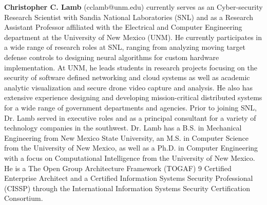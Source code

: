 \documentclass[12pt,letterpaper]{article}
\begin{document}
{\bf Christopher C. Lamb} (cclamb@unm.edu) currently serves as an Cyber-security Research Scientist with Sandia National Laboratories (SNL) and as a Research Assistant Professor affiliated with the Electrical and Computer Engineering department at the University of New Mexico (UNM). He currently participates in a wide range of research roles at SNL, ranging from analyzing moving target defense controls to designing neural algorithms for custom hardware implementation. At UNM, he leads students in research projects focusing on the security of software defined networking and cloud systems as well as academic analytic visualization and secure drone video capture and analysis. He also has extensive experience designing and developing mission-critical distributed systems for a wide range of government departments and agencies. Prior to joining SNL, Dr. Lamb served in executive roles and as a principal consultant for a variety of technology companies in the southwest. Dr. Lamb has a B.S. in Mechanical Engineering from New Mexico State University, an M.S. in Computer Science from the University of New Mexico, as well as a Ph.D. in Computer Engineering with a focus on Computational Intelligence from the University of New Mexico. He is a The Open Group Architecture Framework (TOGAF) 9 Certified Enterprise Architect and a Certified Information Systems Security Professional (CISSP) through the International Information Systems Security Certification Consortium.
\end{document}

